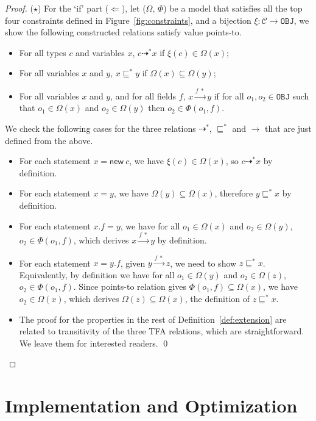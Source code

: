 \documentclass{llncs}
\newcommand{\keyword}[1]{\mathsf{#1}}
\newcommand{\kwnew}[0]{\keyword{new}}
\newcommand\Obj{\mathtt{OBJ}}
\newcommand{\VPT}{\Omega}
\newcommand{\HPT}{\Phi}
\newcommand{\Class}{\mathcal{C}}
\newcommand{\less}{\sqsubseteq}
\newcommand{\tflow}{\dashrightarrow}
\newcommand{\hflow}{\longrightarrow}
\newcommand{\lhflow}[1]{\stackrel{#1}{\hflow}}
\begin{document}
\begin{proof}
\medskip

($\star$) For the `if' part ($\Leftarrow$), let ($\VPT$, $\HPT$) be a model that satisfies all the top four constraints defined in Figure~\ref{fig:constraints}, and a bijection $\xi:\Class\rightarrow\Obj$, we show the following constructed relations satisfy value points-to.
\begin{itemize}
  \item For all types $c$ and variables $x$, $c\tflow^* x$ if $\xi(c)\in\VPT(x)$;
  \item For all variables $x$ and $y$, $x\less^*y$ if $\VPT(x)\subseteq\VPT(y)$;
  \item For all variables $x$ and $y$, and for all fields $f$, $x\lhflow{f\ *}y$ if for all $o_1,o_2\in\Obj$ such that $o_1\in\VPT(x)$ and $o_2\in\VPT(y)$ then $o_2\in\HPT(o_1,f)$.
\end{itemize}
We check the following cases for the three relations $\tflow^*$, $\less^*$ and $\rightarrow$ that are just defined from the above.
\begin{itemize}
\item For each statement $x = \kwnew\ c$, we have $\xi(c)\in\VPT(x)$, so $c\tflow^* x$ by definition.
\item For each statement $x = y$, we have $\VPT(y)\subseteq\VPT(x)$, therefore $y\less^*x$ by definition.
\item For each statement $x.f = y$, we have for all $o_1\in\VPT(x)$ and $o_2\in\VPT(y)$, $o_2\in\HPT(o_1,f)$, which derives $x\lhflow{f\ *}y$ by definition.
\item  For each statement $x = y.f$, given $y\lhflow{f\ *}z$, we need to show $z\less^* x$. Equivalently, by definition we have for all $o_1\in\VPT(y)$ and $o_2\in\VPT(z)$, $o_2\in\HPT(o_1,f)$. Since points-to relation gives $\HPT(o_1,f)\subseteq\VPT(x)$, we have $o_2\in\VPT(x)$, which derives $\VPT(z)\subseteq\VPT(x)$, the definition of $z\less^* x$.
\item The proof for the properties in the rest of Definition~\ref{def:extension} are related to transitivity of the three TFA relations, which are straightforward. We leave them for interested readers. \qed
\end{itemize}
\end{proof}



\section{Implementation and Optimization}\label{sec:minimization}
\end{document}
